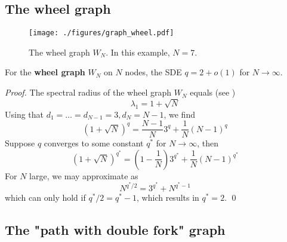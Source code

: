 \documentclass{comnet}%
\begin{document}
\subsection{The wheel graph}
\begin{figure}[H]
	\centering
	\texttt{[image: ./figures/graph\_wheel.pdf]}
	\caption{The wheel graph $W_N$. In this example, $N=7$.}
	\label{fig_wheel_graph}
\end{figure}
\begin{theorem}\label{thm_wheel}
	For the \textbf{wheel graph} $W_N$ on $N$ nodes, the SDE $q = 2 + o(1)$ for $N\to\infty$. 
\end{theorem}
\textit{Proof.} The spectral radius of the wheel graph $W_N$ equals (see \cite[p.\ 212]{GS2})
\begin{equation*}
	\lambda_1 = 1 + \sqrt{N}
\end{equation*}
Using that $d_1 = \ldots = d_{N-1} = 3, d_N = N-1$, we find
\begin{equation*}
	(1+\sqrt{N})^q = \frac{N-1}{N} 3^q + \frac{1}{N} (N-1)^q
\end{equation*}
Suppose $q$ converges to some constant $q^*$ for $N\to\infty$, then
\begin{equation*}
	(1+\sqrt{N})^{q^*} = \left( 1 - \frac{1}{N} \right) 3^{q^*} + \frac{1}{N} (N-1)^{q^*}
\end{equation*}
For $N$ large, we may approximate as
\begin{equation*}
	N^{q^*/2} = 3^{q^*} + N^{q^*-1}
\end{equation*}
which can only hold if $q^*/2 = q^*-1$, which results in $q^*=2$. \hfill\qed

\subsection{The "path with double fork" graph}
\end{document}
